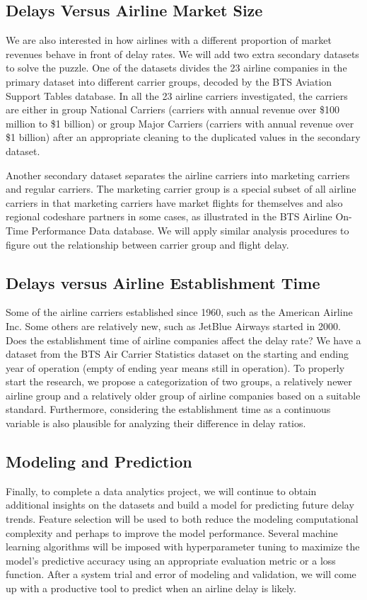 \documentclass[11pt, letterpaper]{article}
\begin{document}
\subsection{Delays Versus Airline Market Size}
We are also interested in how airlines with a different proportion of market revenues behave in front of delay rates. We will add two extra secondary datasets to solve the puzzle. One of the datasets divides the 23 airline companies in the primary dataset into different carrier groups, decoded by the BTS Aviation Support Tables database. In all the 23 airline carriers investigated, the carriers are either in group National Carriers (carriers with annual revenue over \$100 million to \$1 billion) or group Major Carriers (carriers with annual revenue over \$1 billion) after an appropriate cleaning to the duplicated values in the secondary dataset.

Another secondary dataset separates the airline carriers into marketing carriers and regular carriers. The marketing carrier group is a special subset of all airline carriers in that marketing carriers have market flights for themselves and also regional codeshare partners in some cases, as illustrated in the BTS Airline On-Time Performance Data database. We will apply similar analysis procedures to figure out the relationship between carrier group and flight delay.

\subsection{Delays versus Airline Establishment Time}
Some of the airline carriers established since 1960, such as the American Airline Inc. Some others are relatively new, such as JetBlue Airways started in 2000. Does the establishment time of airline companies affect the delay rate? We have a dataset from the BTS Air Carrier Statistics dataset on the starting and ending year of operation (empty of ending year means still in operation). To properly start the research, we propose a categorization of two groups, a relatively newer airline group and a relatively older group of airline companies based on a suitable standard. Furthermore, considering the establishment time as a continuous variable is also plausible for analyzing their difference in delay ratios.

\subsection{Modeling and Prediction}
Finally, to complete a data analytics project, we will continue to obtain additional insights on the datasets and build a model for predicting future delay trends. Feature selection will be used to both reduce the modeling computational complexity and perhaps to improve the model performance. Several machine learning algorithms will be imposed with hyperparameter tuning to maximize the model's predictive accuracy using an appropriate evaluation metric or a loss function. After a system trial and error of modeling and validation, we will come up with a productive tool to predict when an airline delay is likely.
\end{document}
